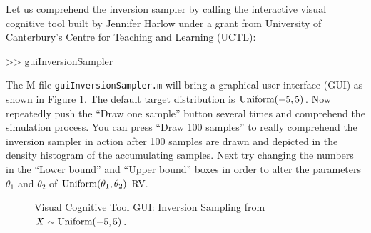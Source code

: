 \begin{labwork}\label{LW:guiInversionSamplerUniform}
Let us comprehend the inversion sampler by calling the interactive visual cognitive tool built by Jennifer Harlow under a grant from University of Canterbury's Centre for Teaching and Learning (UCTL):
\begin{VrbM}
>> guiInversionSampler
\end{VrbM}
The M-file {\tt guiInversionSampler.m} will bring a graphical user interface (GUI) as shown in \hyperref[F:guiInversionSamplerUniform]{Figure \ref*{F:guiInversionSamplerUniform}}.  The default target distribution is $\mbox{{\rm Uniform}}(-5,5)$.  Now repeatedly push the ``Draw one sample'' button several times and comprehend the simulation process.  You can press ``Draw 100 samples'' to really comprehend the inversion sampler in action after 100 samples are drawn and depicted in the density histogram of the accumulating samples.  
Next try changing the numbers in the ``Lower bound'' and ``Upper bound'' boxes in order to alter the parameters $\theta_1$ and $\theta_2$ of $\mbox{{\rm Uniform}}(\theta_1,\theta_2)$ RV.  
\end{labwork}

\begin{figure}[htpb]
\caption{Visual Cognitive Tool GUI: Inversion Sampling from $X \sim \mbox{{\rm Uniform}}(-5,5)$.\label{F:guiInversionSamplerUniform}}
\centering   {}
\end{figure}

